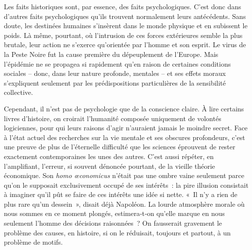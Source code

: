 \documentclass[french,twoside]{book} %
\newcommand{\astermono}{\medskip\centerline{\color{rubric}\large\selectfont{\syms ✻}}\medskip\par}%
\begin{document}
\astermono

\noindent Les faits historiques sont, par essence, des faits psychologiques. C’est donc dans d’autres faits psychologiques qu’ils trouvent normalement leurs antécédents. Sans doute, les destinées humaines s’insèrent dans le monde physique et en subissent le poids. Là même, pourtant, où l’intru­sion de ces forces extérieures semble la plus brutale, leur action ne s’exerce qu’orientée par l’homme et son esprit. Le virus de la Peste Noire fut la cause première du dépeuplement de l’Europe. Mais l’épidémie ne se pro­pagea si rapidement qu’en raison de certaines conditions sociales – donc, dans leur nature profonde, mentales – et ses effets moraux s’expli­quent seulement par les prédispositions particulières de la sensibilité collective.\par
Cependant, il n’est pas de psychologie que de la conscience claire. À lire certains livres d’histoire, on croirait l’humanité composée unique­ment de volontés logiciennes, pour qui leurs raisons d’agir n’auraient jamais le moindre secret. Face à l’état actuel des recherches sur la vie mentale et ses obscures profondeurs, c’est une preuve de plus de l’éternelle difficulté que les sciences éprouvent de rester exactement contempo­raines les unes des autres. C’est aussi répéter, en l’amplifiant, l’erreur, si souvent dénoncée pourtant, de la vieille théorie économique. Son \emph{homo œconomicus} n’était pas une ombre vaine seulement parce qu’on le sup­posait exclusivement occupé de ses intérêts : la pire illusion consistait à imaginer qu’il pût se faire de ces intérêts une idée si nette. « Il n’y a rien de plus rare qu’un dessein », disait déjà Napoléon. La lourde atmos­phère morale où nous sommes en ce moment plongés, estimera‑t‑on  
\label{p102} qu’elle marque en nous seulement l’homme des décisions raisonnées ? On fausserait gravement le problème des causes, en histoire, si on le réduisait, toujours et partout, à un problème de motifs.\par

\astermono
\end{document}
